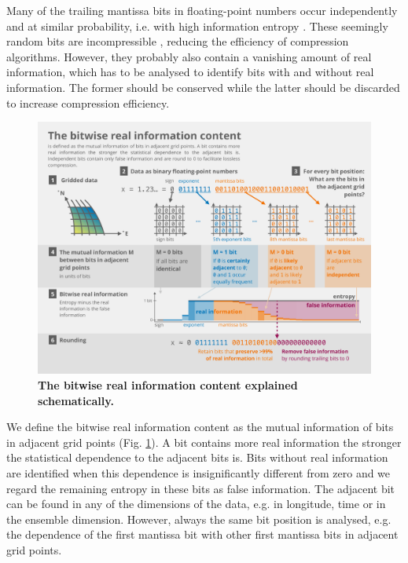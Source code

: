 Many of the trailing mantissa bits in floating-point numbers occur independently and at similar probability,
i.e. with high information entropy \citep{Kleeman2011,Jeffress2017}. These seemingly random bits are
incompressible \citep{MacKay2003,Ziv1977,Huffman1952}, reducing
the efficiency of compression algorithms. However, they probably also contain a vanishing amount of real
information, which has to be analysed to identify bits with and without real information. The former should
be conserved while the latter should be discarded to increase compression efficiency.

\begin{figure}[tbhp]
	\includegraphics[width=1\textwidth]{Figures/compression/infograph_cut.pdf}
	\caption{\textbf{The bitwise real information content explained schematically.}}
	\label{fig:infograph}
\end{figure}

We define the bitwise real information content as the mutual information
\citep{Shannon1948,MacKay2003,Schreiber2000,Kraskov2004,Pothapakula2019,DelSole2004} of bits in
adjacent grid points (Fig. \ref{fig:infograph}). A bit contains more real information the stronger the statistical
dependence to the adjacent bits is. Bits without real information are identified when this dependence is
insignificantly different from zero and we regard the remaining entropy in these bits as false information.
The adjacent bit can be found in any of the dimensions of the data, e.g. in longitude, time or in the ensemble
dimension. However, always the same bit position is analysed, e.g. the dependence of the first mantissa bit
with other first mantissa bits in adjacent grid points. 

